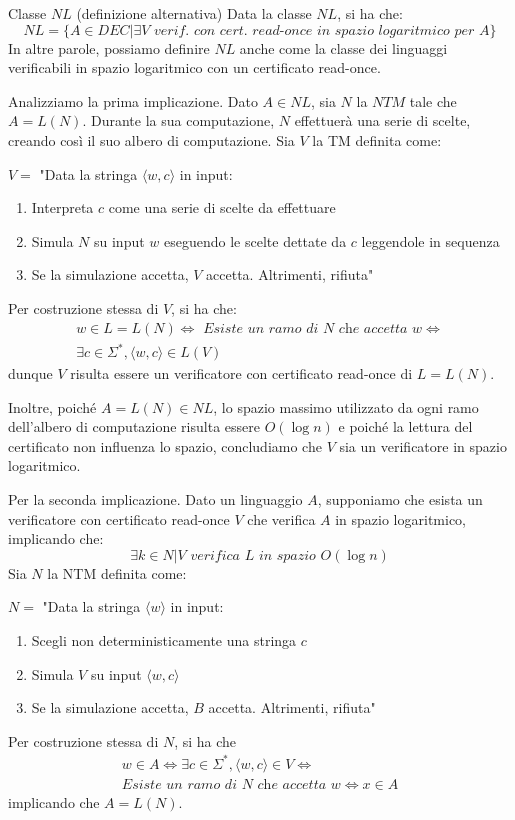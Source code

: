 \begin{Thm}{Classe $NL$ (definizione alternativa)}{}
Data la classe $NL$, si ha che:
\begin{equation*}
    NL = \{A\in DEC | \exists V\textit{ verif. con cert. read-once in spazio logaritmico per }A\}    
\end{equation*}
In altre parole, possiamo definire $NL$ anche come la classe dei linguaggi verificabili in spazio logaritmico con un certificato read-once.
\begin{demonstration}
Analizziamo la prima implicazione. Dato $A\in NL$, sia $N$ la $NTM$ tale che $A = L(N)$. Durante la sua computazione, $N$ effettuerà una serie di scelte, creando così il suo albero di computazione. Sia $V$ la TM definita come: 

$V =$ "Data la stringa $\langle w, c\rangle$ in input:
\begin{enumerate}
    \item Interpreta $c$ come una serie di scelte da effettuare
    \item Simula $N$ su input $w$ eseguendo le scelte dettate da $c$ leggendole in sequenza
    \item Se la simulazione accetta, $V$ accetta. Altrimenti, rifiuta"
\end{enumerate}
Per costruzione stessa di $V$, si ha che:
\begin{align*}
w\in L = L(N) \iff\textit{ Esiste un ramo di }N\textit{ che accetta }w\iff\\
\exists c\in \Sigma^*,\langle w, c\rangle\in L(V)
\end{align*}
dunque $V$ risulta essere un verificatore con certificato read-once di $L = L(N)$.

Inoltre, poiché $A = L(N)\in NL$, lo spazio massimo utilizzato da ogni ramo dell’albero di computazione risulta essere $O(\log n)$ e poiché la lettura del certificato non influenza lo spazio, concludiamo che $V$ sia un verificatore in spazio logaritmico.

Per la seconda implicazione. Dato un linguaggio $A$, supponiamo che esista un verificatore con certificato read-once $V$ che verifica $A$ in spazio logaritmico, implicando che:
\begin{equation*}
    \exists k\in N | V\textit{ verifica }L\textit{ in spazio }O(\log n)    
\end{equation*}
Sia $N$ la NTM definita come:

$N =$ "Data la stringa $\langle w\rangle$ in input:
\begin{enumerate}
    \item Scegli non deterministicamente una stringa $c$
    \item Simula $V$ su input $\langle w, c\rangle$
    \item Se la simulazione accetta, $B$ accetta. Altrimenti, rifiuta"
\end{enumerate}
Per costruzione stessa di $N$, si ha che
\begin{align*}
    w\in A\iff \exists c\in \Sigma^*,\langle w, c\rangle\in V\iff\\
\textit{Esiste un ramo di }N\textit{ che accetta }w\iff x\in A    
\end{align*}
implicando che $A = L(N)$.


\end{demonstration}
\end{Thm}
